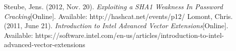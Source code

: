 \documentclass[letterpaper, 10 pt, conference]{ieeeconf}  %
\begin{document}
















\begin{thebibliography}{99}

 Steube, Jens. (2012, Nov. 20). \emph{Exploiting a SHA1 Weakness In Password Cracking}[Online]. Available: http://hashcat.net/events/p12/
 Lomont, Chris. (2011, June 21). \emph{Introduction to Intel Advanced Vector Extensions}[Online]. Available: https://software.intel.com/en-us/articles/introduction-to-intel-advanced-vector-extensions
 

\end{thebibliography}
\end{document}
